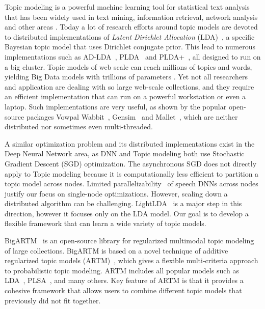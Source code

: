\documentclass[russian,english]{llncs}
\begin{document}
Topic modeling \cite{blei12ptm} is a powerful machine learning tool for statistical text analysis
that has been widely used in text mining, information retrieval, network analysis and other areas \cite{daud10knowledge}.
Today a lot of research efforts around topic models are devoted to distributed implementations of
\emph{Latent Dirichlet Allocation} (LDA)~\cite{blei03latent},
a specific Bayesian topic model that uses Dirichlet conjugate prior.
This lead to numerous implementations such as
AD-LDA~\cite{newman09distributed}, PLDA~\cite{wang09plda} and PLDA{+}~\cite{liu11plda},
all designed to run on a big cluster.
Topic models of web scale can reach millions of topics and words,
yielding Big Data models with trillions of parameters \cite{yuan15lightlda}.
Yet not all researchers and application are dealing with so large web-scale collections,
and they require an efficient implementation that can run on a powerful workstation or even a laptop.
Such implementations are very useful,
as shown by the popular open-source packages
Vowpal Wabbit~\cite{langford07vw}, Gensim~\cite{rehurek10software} and Mallet~\cite{McCallum02mallet},
which are neither distributed nor sometimes even multi-threaded.

A similar optimization problem and its distributed implementations exist
in the Deep Neural Network area, as
DNN and Topic modeling both use Stochastic Gradient Descent (SGD) optimization.
The asynchronous SGD \cite{dean2012sgd} does not directly apply to Topic modeling because
it is computationally less efficient to partition a topic model across nodes.
Limited parallelizability~\cite{seide2014sgd} of speech DNNs across nodes justify our focus on single-node optimizations.
However, scaling down a distributed algorithm can be challenging.
LightLDA~\cite{yuan15lightlda} is a major step in this direction,
however it focuses only on the LDA model.
Our goal is to develop a flexible framework that can learn a wide variety of topic models.

BigARTM~\cite{vfardi15aist} is an open-source library for
regularized multimodal topic modeling of large collections.
BigARTM is based on a novel technique of additive regularized topic models (ARTM)~\cite{voron14dan-eng,voron14aist,voron15mlj,voron15nonbayesian},
which gives a flexible multi-criteria approach to probabilistic topic modeling.
ARTM includes all popular models such as 
LDA~\cite{blei03latent}, 
PLSA~\cite{hofmann99plsi},
and many others.
Key feature of ARTM is that it provides a cohesive framework that allows users to combine
different topic models that previously did not fit together.
\end{document}
